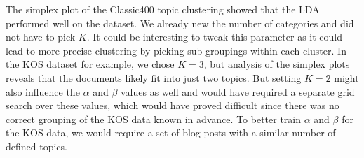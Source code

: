 \documentclass[10pt]{article}
\begin{document}
The simplex plot of the Classic400 topic clustering showed that the LDA performed well on the dataset. We already new the number of categories and did not have to pick $K$. It could be interesting to tweak this parameter as it could lead to more precise clustering by picking sub-groupings within each cluster. In the KOS dataset for example, we chose $K=3$, but analysis of the simplex plots reveals that the documents likely fit into just two topics. But setting $K=2$ might also influence the $\alpha$ and $\beta$ values as well and would have required a separate grid search over these values, which would have proved difficult since there was no correct grouping of the KOS data known in advance. To better train $\alpha$ and $\beta$ for the KOS data, we would require a set of blog posts with a similar number of defined topics.





\end{document}
